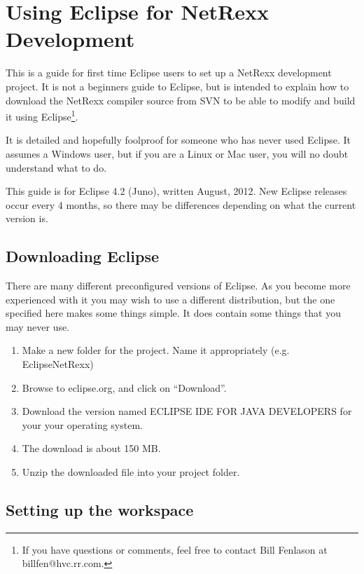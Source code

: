 \chapter{Using Eclipse for NetRexx Development}\label{setupeclipse}
 
This is a guide for first time Eclipse users to set up a NetRexx
development project.  It is not a beginners guide to Eclipse, but is
intended to explain how to download the NetRexx compiler source from
SVN to be able to modify and build it using Eclipse\footnote{If you
  have questions or comments, feel free to contact Bill Fenlason at billfen@hvc.rr.com.}.
 
It is detailed and hopefully foolproof for someone who has never used
Eclipse.  It assumes a Windows user, but if you are a Linux or Mac
user, you will no doubt understand what to do.
 
This guide is for Eclipse 4.2 (Juno), written August, 2012.  New
Eclipse releases occur every 4 months, so there may be differences
depending on what the current version is.
 
\section{Downloading Eclipse}
 
There are many different preconfigured versions of Eclipse.  As you
become more experienced with it you may wish to use a different
distribution, but the one specified here makes some things simple.  It
does contain some things that you may never use.
\begin{enumerate}
\item Make a new folder for the project.  Name it appropriately
   (e.g. EclipseNetRexx)
\item Browse to eclipse.org, and click on ``Download''.
\item Download the version named ECLIPSE IDE FOR JAVA DEVELOPERS for your
   your operating system.
\item The download is about 150 MB.
\item Unzip the downloaded file into your project folder.
\end{enumerate}
\section{Setting up the workspace}
 
